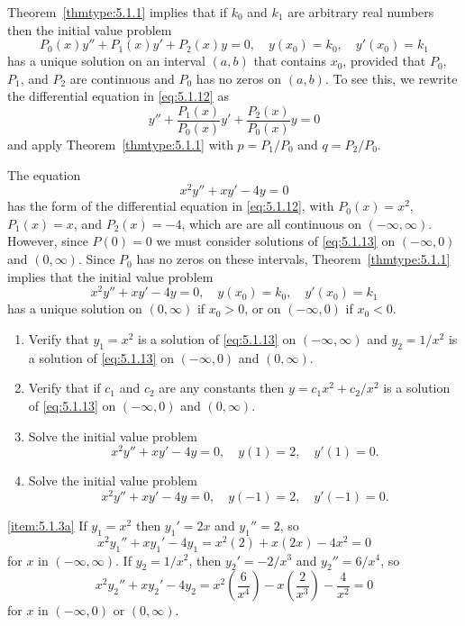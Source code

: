 \documentclass{ximera}
\begin{document}
Theorem~\ref{thmtype:5.1.1} implies that if $k_0$ and $k_1$ are
arbitrary real numbers then the initial value problem
\begin{equation}\label{eq:5.1.12}
P_0(x)y''+P_1(x)y'+P_2(x)y=0,\quad y(x_0)=k_0,\quad y'(x_0)=k_1
\end{equation}
has a unique solution on an interval $(a,b)$ that contains $x_0$,
provided that $P_0$, $P_1$, and $P_2$ are continuous and $P_0$
has no zeros on $(a,b)$. To see this, we rewrite the differential
equation in  \eqref{eq:5.1.12} as
$$
y''+\frac{P_1(x)}{P_0(x)}y'+\frac{P_2(x)}{P_0(x)}y=0
$$
and apply Theorem~\ref{thmtype:5.1.1} with $p=P_1/P_0$ and $q=P_2/P_0$.

\begin{example}\label{example:5.1.3}  
The equation
\begin{equation}\label{eq:5.1.13}
x^2y''+xy'-4y=0
\end{equation}
has the form of the differential equation in \eqref{eq:5.1.12}, with
$P_0(x)=x^2$, $P_1(x)=x$, and $P_2(x)=-4$, which are are all
continuous on $(-\infty,\infty)$. However, since $P(0)=0$ we must
consider solutions of \eqref{eq:5.1.13} on $(-\infty,0)$ and $(0,\infty)$.
Since $P_0$ has no zeros on these intervals, Theorem~\ref{thmtype:5.1.1}
implies that the initial value problem
$$
x^2y''+xy'-4y=0,\quad y(x_0)=k_0,\quad y'(x_0)=k_1
$$
has a unique solution on $(0,\infty)$ if $x_0>0$, or on $(-\infty,0)$
if $x_0<0$.

\begin{enumerate}
\item\label{item:5.1.3a}%
Verify that $y_1=x^2$ is a solution of \eqref{eq:5.1.13} on
$(-\infty,\infty)$ and $y_2=1/x^2$ is a solution of \eqref{eq:5.1.13}
on $(-\infty,0)$  and $(0,\infty)$.
\item\label{item:5.1.3b}%
Verify that if $c_1$ and $c_2$ are any constants then
$y=c_1x^2+c_2/x^2$ is a solution of \eqref{eq:5.1.13} on $(-\infty,0)$
and $(0,\infty)$.
\item\label{item:5.1.3c}%
Solve the initial value problem
\begin{equation}\label{eq:5.1.14}
x^2y''+xy'-4y=0,\quad y(1)=2,\quad y'(1)=0.
\end{equation}
\item\label{item:5.1.3d}%
Solve the initial value problem
\begin{equation}\label{eq:5.1.15}
x^2y''+xy'-4y=0,\quad y(-1)=2,\quad y'(-1)=0.
\end{equation}
\end{enumerate}
\begin{explanation}
\ref{item:5.1.3a} If $y_1=x^2$ then $y_1'=2x$ and $y_1''=2$, so
$$
x^2y_1''+xy_1'-4y_1=x^2(2)+x(2x)-4x^2=0
$$
for $x$ in $(-\infty,\infty)$.
If $y_2=1/x^2$, then $y_2'=-2/x^3$ and $y_2''=6/x^4$, so
$$
x^2y_2''+xy_2'-4y_2=x^2\left(\frac{6}{x^4}\right)-x\left(\frac{2}{x^3}\right)-{\frac{4}{x^2}}=0
$$
for $x$ in $(-\infty,0)$ or $(0,\infty)$.


\end{explanation}
\end{example}
\end{document}
